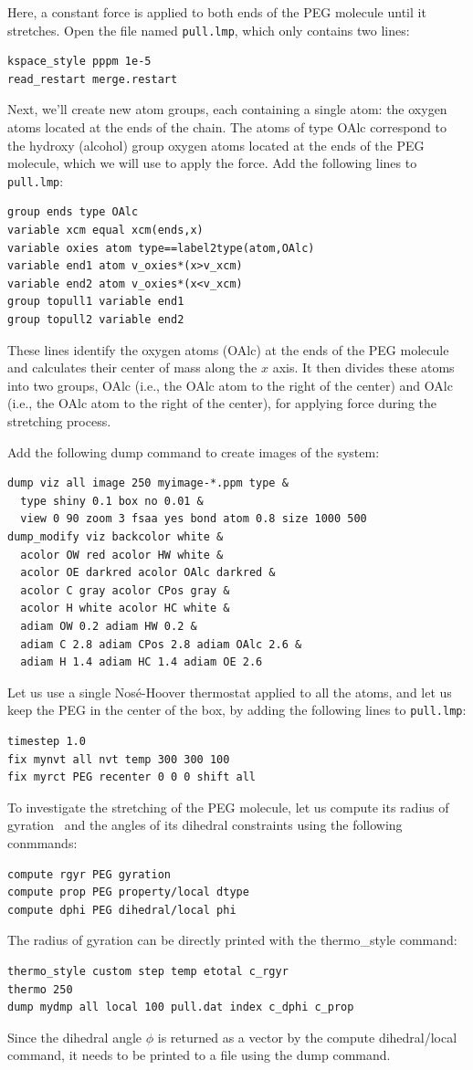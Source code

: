 \documentclass[9pt,tutorial]{livecoms}
\newcommand{\lmpcmd}[1]{\hspace{0pt}\colorbox{listing}{\textcolor{command}{\small{#1}}}\hspace{0pt}} %
\newcommand{\flecmd}[1]{\textcolor{command}{\texttt{#1}}} %
\begin{document}
Here, a constant force is applied to both ends of the PEG molecule until it
stretches.  Open the file named \flecmd{pull.lmp}, which 
only contains two lines:
\begin{lstlisting}
kspace_style pppm 1e-5
read_restart merge.restart
\end{lstlisting}
Next, we'll create new atom groups, each containing a single atom: the oxygen
atoms located at the ends of the chain.  The atoms of type \lmpcmd{OAlc}
correspond to the hydroxy (alcohol) group oxygen atoms located at the ends
of the PEG molecule, which we will use to apply the force.  Add the
following lines to \flecmd{pull.lmp}:
\begin{lstlisting}
group ends type OAlc
variable xcm equal xcm(ends,x)
variable oxies atom type==label2type(atom,OAlc)
variable end1 atom v_oxies*(x>v_xcm)
variable end2 atom v_oxies*(x<v_xcm)
group topull1 variable end1
group topull2 variable end2
\end{lstlisting}
These lines identify the oxygen atoms (\lmpcmd{OAlc}) at the ends of the PEG
molecule and calculates their center of mass along the $x$ axis.  It then
divides these atoms into two groups, \lmpcmd{OAlc} (i.e., the OAlc atom to
the right of the center) and \lmpcmd{OAlc} (i.e., the OAlc atom to the right
of the center), for applying force during the stretching process.

Add the following \lmpcmd{dump} command to create images of the system:
\begin{lstlisting}
dump viz all image 250 myimage-*.ppm type &
  type shiny 0.1 box no 0.01 &
  view 0 90 zoom 3 fsaa yes bond atom 0.8 size 1000 500 
dump_modify viz backcolor white &
  acolor OW red acolor HW white &
  acolor OE darkred acolor OAlc darkred &
  acolor C gray acolor CPos gray &
  acolor H white acolor HC white &
  adiam OW 0.2 adiam HW 0.2 &
  adiam C 2.8 adiam CPos 2.8 adiam OAlc 2.6 &
  adiam H 1.4 adiam HC 1.4 adiam OE 2.6
\end{lstlisting}
Let us use a single Nosé-Hoover thermostat applied to all the atoms,
and let us keep the PEG in the center of the box, by adding
the following lines to \flecmd{pull.lmp}:
\begin{lstlisting}
timestep 1.0
fix mynvt all nvt temp 300 300 100
fix myrct PEG recenter 0 0 0 shift all
\end{lstlisting}

To investigate the stretching of the PEG molecule, let us compute its radius of
gyration~\cite{fixmanRadiusGyrationPolymer1962a} and the angles of its dihedral
constraints using the following conmmands:
\begin{lstlisting}
compute rgyr PEG gyration
compute prop PEG property/local dtype
compute dphi PEG dihedral/local phi
\end{lstlisting}
The radius of gyration can be directly printed with the \lmpcmd{thermo\_style} command:
\begin{lstlisting}
thermo_style custom step temp etotal c_rgyr
thermo 250
dump mydmp all local 100 pull.dat index c_dphi c_prop
\end{lstlisting}
Since the dihedral angle $\phi$ is returned as a vector by the compute
\lmpcmd{dihedral/local} command, it needs to be printed to a file using
the \lmpcmd{dump} command.
\end{document}
